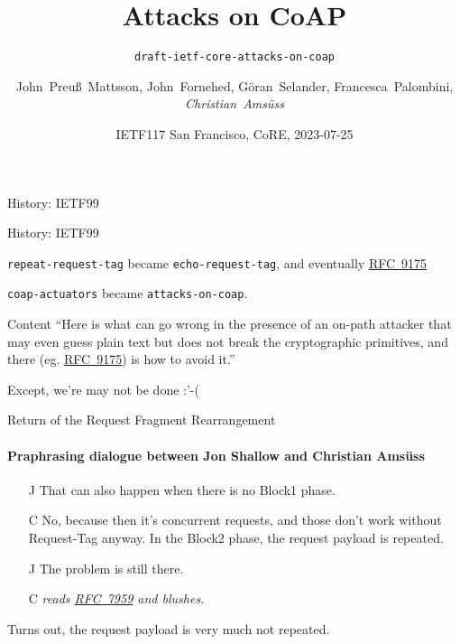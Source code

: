 \documentclass[aspectratio=169,colorlinks]{beamer}
\title{Attacks on CoAP}
\subtitle{\texttt{draft-ietf-core-attacks-on-coap}}
\author{John~Preuß~Mattsson, John~Fornehed, Göran~Selander, Francesca~Palombini, \textit{Christian~Amsüss}}
\date{IETF117 San Francisco, CoRE, 2023-07-25}
\newcommand{\rfc}[1]{\href{https://datatracker.ietf.org/doc/html/rfc#1}{RFC~#1}}
\begin{document}
\frame{\titlepage}

\begin{frame}{History: IETF99}
\end{frame}

\begin{frame}{History: IETF99}

	\texttt{repeat-request-tag} became \texttt{echo-request-tag}, and eventually \rfc{9175}

	\texttt{coap-actuators} became \texttt{attacks-on-coap}.
\end{frame}

\begin{frame}{Content}\large
	``Here is what can go wrong
	in the presence of an on-path attacker
	that may even guess plain text
	but does not break the cryptographic primitives,
	and there (eg. \rfc{9175}) is how to avoid it.''

	\vspace{2cm}

	Except, we're may not be done :'-(
\end{frame}

\begin{frame}{Return of the Request Fragment Rearrangement}\large
	\framesubtitle{Praphrasing dialogue between Jon Shallow and Christian Amsüss}
	\begin{itemize}
		\item[J] That can also happen when there is no Block1 phase.
		\item[C] No, because then it's concurrent requests, and those don't work without Request-Tag anyway. In the Block2 phase, the request payload is repeated.
		\item[J] The problem is still there.
		\item[C] \textit{reads \rfc{7959} and blushes.}
	\end{itemize}

	\bigskip

	Turns out, the request payload is very much not repeated.
\end{frame}
\end{document}
